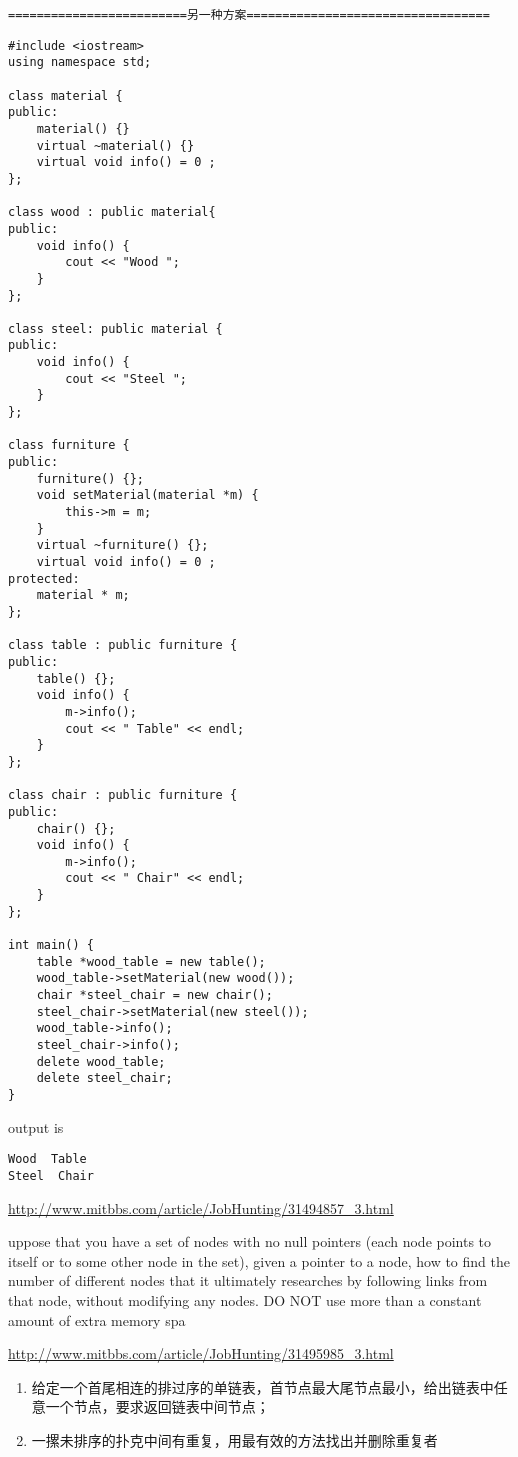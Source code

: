 \documentclass[12pt]{book}
\begin{document}
\texttt{=========================另一种方案==================================}
\lstset{language=java,label= ,caption= ,numbers=none}
\begin{lstlisting}
#include <iostream>
using namespace std;

class material {
public:
    material() {}
    virtual ~material() {}
    virtual void info() = 0 ; 
};

class wood : public material{
public:
    void info() {
        cout << "Wood ";
    }
};

class steel: public material {
public:
    void info() {
        cout << "Steel ";
    }
};

class furniture {
public:
    furniture() {};
    void setMaterial(material *m) {
        this->m = m;
    }
    virtual ~furniture() {};
    virtual void info() = 0 ;
protected:
    material * m;
};

class table : public furniture {
public:
    table() {};
    void info() {
        m->info();
        cout << " Table" << endl;
    }
};

class chair : public furniture {
public:
    chair() {};
    void info() {
        m->info();
        cout << " Chair" << endl;
    }
};

int main() {
    table *wood_table = new table();
    wood_table->setMaterial(new wood());
    chair *steel_chair = new chair();
    steel_chair->setMaterial(new steel());
    wood_table->info();
    steel_chair->info();
    delete wood_table;
    delete steel_chair;
}
\end{lstlisting}

output is

\lstset{language=java,label= ,caption= ,numbers=none}
\begin{lstlisting}
Wood  Table
Steel  Chair
\end{lstlisting}

\url{http://www.mitbbs.com/article/JobHunting/31494857_3.html}

uppose that you have a set of nodes with no null pointers (each node points to itself or to some other node in the set), given a pointer to a node, how to find the number of different nodes that it ultimately researches by following links from that node, without modifying any nodes. DO NOT use more than a constant amount of extra memory spa

\url{http://www.mitbbs.com/article/JobHunting/31495985_3.html}

\begin{enumerate}
\item 给定一个首尾相连的排过序的单链表，首节点最大尾节点最小，给出链表中任意一个节点，要求返回链表中间节点；

\item 一摞未排序的扑克中间有重复，用最有效的方法找出并删除重复者
\end{enumerate}
\end{document}
